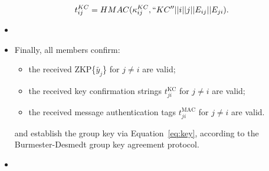 \begin{itemize}
\begin{align*}
        t_{ij}^{KC} &= HMAC(\kappa_{ij}^{KC}, ``KC'' || i || j || E_{ij} || E_{ji}).
        \end{align*}
    \item[]
    \item[] Finally, all members confirm:
        \begin{itemize}
            \item the received ZKP\{$\tilde{y_j}$\} for $j \neq i$ are valid;
            \item the received key confirmation strings $t^{\text{KC}}_{ji}$ for $j \neq i$ are valid;
            \item the received message authentication tags $t^{\text{MAC}}_{ji}$ for $j \neq i$ are valid.
        \end{itemize}
        and establish the group key via Equation~\eqref{eq:key}, according to the Burmester-Desmedt group key agreement protocol. 
        \item[] 
\end{itemize}


